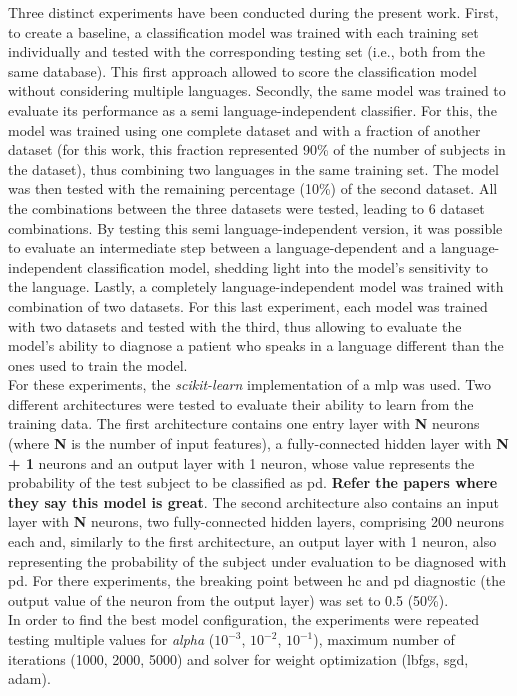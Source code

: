 Three distinct experiments have been conducted during the present work. First, to create a baseline, a classification model was trained with each training set individually and tested with the corresponding testing set (i.e., both from the same database). This first approach allowed to score the classification model without considering multiple languages. Secondly, the same model was trained to evaluate its performance as a semi language-independent classifier. For this, the model was trained using one complete dataset and with a fraction of another dataset (for this work, this fraction represented 90\% of the number of subjects in the dataset), thus combining two languages in the same training set. The model was then tested with the remaining percentage (10\%) of the second dataset. All the combinations between the three datasets were tested, leading to 6 dataset combinations. By testing this semi language-independent version, it was possible to evaluate an intermediate step between a language-dependent and a language-independent classification model, shedding light into the model's sensitivity to the language. Lastly, a completely language-independent model was trained with combination of two datasets. For this last experiment, each model was trained with two datasets and tested with the third, thus allowing to evaluate the model's ability to diagnose a patient who speaks in a language different than the ones used to train the model.
\\
For these experiments, the \textit{scikit-learn} implementation \cite{scikit-learn} of a \gls{mlp} was used. Two different architectures were tested to evaluate their ability to learn from the training data. The first architecture contains one entry layer with \textbf{N} neurons (where \textbf{N} is the number of input features), a fully-connected hidden layer with \textbf{N + 1} neurons and an output layer with 1 neuron, whose value represents the probability of the test subject to be classified as \gls{pd}. \textbf{Refer the papers where they say this model is great}. The second architecture also contains an input layer with \textbf{N} neurons, two fully-connected hidden layers, comprising 200 neurons each and, similarly to the first architecture, an output layer with 1 neuron, also representing the probability of the subject under evaluation to be diagnosed with \gls{pd}. For there experiments, the breaking point between \gls{hc} and \gls{pd} diagnostic (the output value of the neuron from the output layer) was set to 0.5 (50\%).
\\
In order to find the best model configuration, the experiments were repeated testing multiple values for \textit{alpha} ($ 10^{-3} $, $ 10 ^{-2} $, $ 10 ^{-1} $), maximum number of iterations (1000, 2000, 5000) and solver for weight optimization (lbfgs, sgd, adam). 

